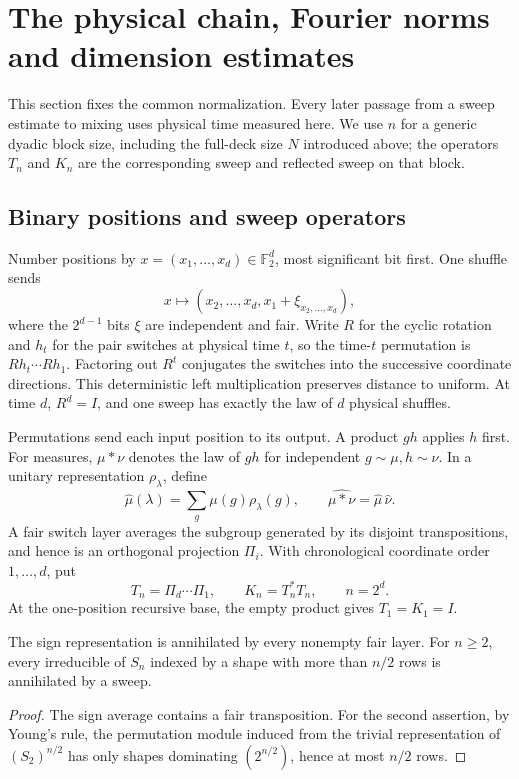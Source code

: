 \section{The physical chain, Fourier norms and dimension estimates}\label{sec:prelim}
This section fixes the common normalization. Every later passage from a sweep estimate to mixing uses physical time measured here. We use $n$ for a generic dyadic block size, including the full-deck size $N$ introduced above; the operators $T_n$ and $K_n$ are the corresponding sweep and reflected sweep on that block.

\subsection{Binary positions and sweep operators}
Number positions by $x=(x_1,\ldots,x_d)\in\mathbb F_2^d$, most significant bit first. One shuffle sends
\[
 x\longmapsto(x_2,\ldots,x_d,x_1+\xi_{x_2,\ldots,x_d}),
\]
where the $2^{d-1}$ bits $\xi$ are independent and fair. Write $R$ for the cyclic rotation and $h_t$ for the pair switches at physical time $t$, so the time-$t$ permutation is $Rh_t\cdots Rh_1$. Factoring out $R^t$ conjugates the switches into the successive coordinate directions. This deterministic left multiplication preserves distance to uniform. At time $d$, $R^d=I$, and one sweep has exactly the law of $d$ physical shuffles.

Permutations send each input position to its output. A product $gh$ applies $h$ first. For measures, $\mu*\nu$ denotes the law of $gh$ for independent $g\sim\mu,h\sim\nu$. In a unitary representation $\rho_\lambda$, define
\[
 \widehat\mu(\lambda)=\sum_g\mu(g)\rho_\lambda(g),
 \qquad\widehat{\mu*\nu}=\widehat\mu\,\widehat\nu.
\]
A fair switch layer averages the subgroup generated by its disjoint transpositions, and hence is an orthogonal projection $\Pi_i$. With chronological coordinate order $1,\ldots,d$, put
\[
 T_n=\Pi_d\cdots\Pi_1,\qquad K_n=T_n^*T_n,
 \qquad n=2^d.
\]
At the one-position recursive base, the empty product gives $T_1=K_1=I$.
\begin{lemma}\label{lem:annihilation}
The sign representation is annihilated by every nonempty fair layer. For $n\ge2$, every irreducible of $S_n$ indexed by a shape with more than $n/2$ rows is annihilated by a sweep.
\end{lemma}\begin{proof}
The sign average contains a fair transposition. For the second assertion, by Young's rule, the permutation module induced from the trivial representation of $(S_2)^{n/2}$ has only shapes dominating $(2^{n/2})$, hence at most $n/2$ rows.
\end{proof}

